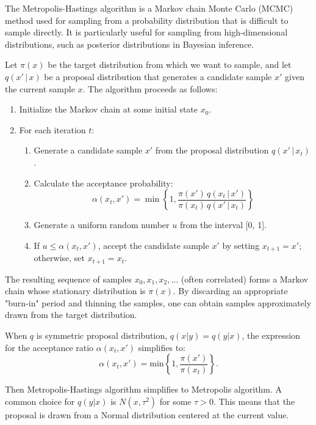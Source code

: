 \documentclass[11pt]{article}
\begin{document}
\begin{tcolorbox}[colback=blue!5!white,colframe=blue!75!black,title=Metropolis-Hastings Algorithm]
The Metropolis-Hastings algorithm is a Markov chain Monte Carlo (MCMC) method used for sampling from a probability distribution that is difficult to sample directly. It is particularly useful for sampling from high-dimensional distributions, such as posterior distributions in Bayesian inference.

Let \( \pi(x) \) be the target distribution from which we want to sample, and let \( q(x' \, | \, x) \) be a proposal distribution that generates a candidate sample \( x' \) given the current sample \( x \). The algorithm proceeds as follows:

\begin{enumerate}
    \item Initialize the Markov chain at some initial state \( x_0 \).
    \item For each iteration \( t \):
    \begin{enumerate}
        \item Generate a candidate sample \( x' \) from the proposal distribution \( q(x' \, | \, x_t) \).
        \item Calculate the acceptance probability:
        \[
        \alpha(x_t, x') = \min\left\{1, \frac{\pi(x') \, q(x_t \, | \, x')}{\pi(x_t) \, q(x' \, | \, x_t)}\right\}
        \]
        \item Generate a uniform random number \( u \) from the interval [0, 1].
        \item If \( u \leq \alpha(x_t, x') \), accept the candidate sample \( x' \) by setting \( x_{t+1} = x' \); otherwise, set \( x_{t+1} = x_t \).
    \end{enumerate}
\end{enumerate}


The resulting sequence of samples \( x_0, x_1, x_2, \ldots \) (often correlated) forms a Markov chain whose stationary distribution is \( \pi(x) \). By discarding an appropriate "burn-in" period and thinning the samples, one can obtain samples approximately drawn from the target distribution.

\end{tcolorbox}

\begin{tcolorbox}[colback=blue!5!white,colframe=blue!75!black,title=Metropolis Algorithm]
When $q$ is symmetric proposal distribution, $q\left( x|y \right) =q\left( y|x \right) $,  the expression for the acceptance ratio $\alpha\left( x_t, x' \right) $ simplifies to: 
\[
\alpha\left( x_t, x' \right) = \text{min}\left\{1, \frac{\pi(x')}{\pi(x_t)}\right\}
.\] 

Then Metropolis-Hastings algorithm simplifies to Metropolis algorithm. A common choice for $q(y|x)$ is $N(x, \tau^2)$ for some $\tau>0$. This means that the proposal is drawn from a Normal distribution centered at the current value.
\end{tcolorbox}
\end{document}

